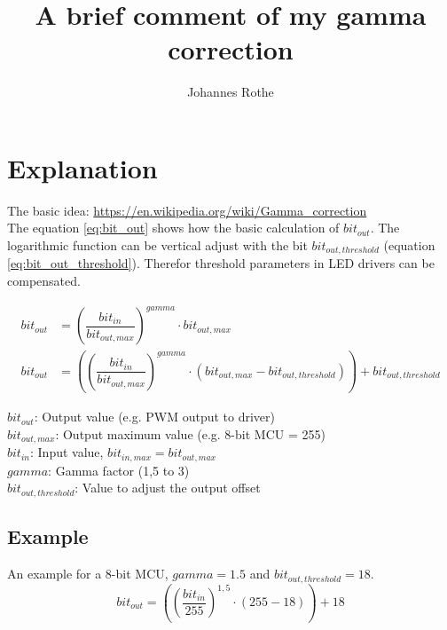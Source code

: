 \documentclass[11pt,a4paper]{article}
\title{A brief comment of my gamma correction}
\author{Johannes Rothe}
\begin{document}
\maketitle 
\section{Explanation}
The basic idea: \url{https://en.wikipedia.org/wiki/Gamma_correction}\\
The equation \ref{eq:bit_out} shows how the basic calculation of $bit_{out}$.
The logarithmic function can be vertical adjust with the bit $bit_{out,threshold}$ (equation \ref{eq:bit_out_threshold}).
Therefor threshold parameters in LED drivers can be compensated.

\begin{align} 
    \label{eq:bit_out}
    bit_{out} &= \left(\dfrac{bit_{in}}{bit_{out,max}} \right)^{gamma} \cdot 
        bit_{out,max} \\
    \label{eq:bit_out_threshold}
    bit_{out} &= \left( \left(\dfrac{bit_{in}}{bit_{out,max}} \right)^{gamma} \cdot 
        (bit_{out,max} - bit_{out,threshold}) \right) + bit_{out,threshold}
\end{align}

\indent $bit_{out}$: Output value (e.g. PWM output to driver)\\
\indent $bit_{out,max}$: Output maximum value (e.g. 8-bit MCU = 255) \\
\indent $bit_{in}$: Input value, $bit_{in,max} = bit_{out,max}$ \\
\indent $gamma$: Gamma factor (1,5 to 3)\\
\indent $bit_{out,threshold}$: Value to adjust the output offset \\

\subsection{Example}
An example for a 8-bit MCU, $gamma = 1.5$ and $bit_{out,threshold} = 18$.\\
\begin{equation}\label{eq:ex}
    bit_{out} = \left( \left(\dfrac{bit_{in}}{255} \right)^{1,5} \cdot 
        (255 - 18) \right) + 18
\end{equation}


% 
\end{document}
